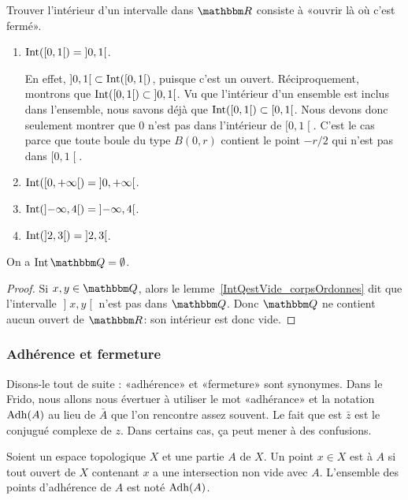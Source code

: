 \begin{example}
  Trouver l'intérieur d'un intervalle dans $\eR$ consiste à «ouvrir là où c'est fermé».
  \begin{enumerate}
  \item
    $\operatorname{Int}(\mathopen[ 0 , 1 \mathclose[)=\mathopen] 0 , 1 \mathclose[$.

    En effet, $\mathopen] 0,1  \mathclose[\subset\operatorname{Int}(\mathopen[ 0 , 1 \mathclose[)$, puisque c'est un ouvert. Réciproquement, montrons que $\operatorname{Int}( \mathopen[ 0 , 1\mathclose [ )\subset\mathopen] 0 , 1 \mathclose[$. Vu que l'intérieur d'un ensemble est inclus dans l'ensemble, nous savons déjà que $\operatorname{Int}( \mathopen[ 0 , 1\mathclose [ )\subset\mathopen[ 0 , 1 \mathclose[$. Nous devons donc seulement montrer que $0$ n'est pas dans l'intérieur de $\mathopen[ 0 , 1 \mathclose[$. C'est le cas parce que toute boule du type $B(0,r)$ contient le point $-r/2$ qui n'est pas dans $\mathopen[ 0 , 1 \mathclose[$.
  \item
    $\operatorname{Int}( \mathopen[ 0 , + \infty [)=\mathopen] 0 , + \infty \mathclose[$.
  \item
    $\operatorname{Int}( \mathopen] - \infty, 4 [ )=\mathopen] - \infty, 4 \mathclose[$.
  \item
    $\operatorname{Int}( \mathopen] 2 , 3 \mathclose[ )=\mathopen] 2 , 3 \mathclose[$.
  \end{enumerate}
\end{example}

\begin{proposition}\label{IntQestVide}
  On a \( \Int \eQ = \emptyset \).
\end{proposition}
\begin{proof}
  Si \( x, y \in \eQ \), alors le lemme~\ref{IntQestVide_corpsOrdonnes} dit que l'intervalle \( \mathopen] x, y \mathclose[ \) n'est pas dans \( \eQ \). Donc \( \eQ \) ne contient aucun ouvert de \( \eR \): son intérieur est donc vide. 
\end{proof}

\subsubsection{Adhérence et fermeture}

Disons-le tout de suite : «adhérence» et «fermeture» sont synonymes. Dans le Frido, nous allons nous évertuer à utiliser le mot «adhérance» et la notation \( \operatorname{Adh}(A)\) au lieu de \( \bar A\) que l'on rencontre assez souvent. Le fait que est \( \bar z\) est le conjugué complexe de \( z\). Dans certains cas, ça peut mener à des confusions.
\begin{definition}      \label{DEFooSVWMooLpAVZR}
    Soient un espace topologique \( X\) et une partie \( A\) de \( X\). Un point \( x\in X\) est  à \( A\) si tout ouvert de \( X\) contenant \( x\) a une intersection non vide avec \( A\). L'ensemble des points d'adhérence de \( A\) est noté $\operatorname{Adh}(A)$.
\end{definition}

